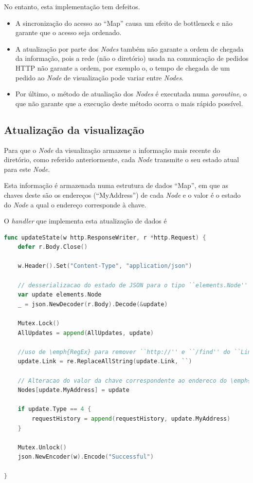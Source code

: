 No entanto, esta implementação tem defeitos. 
\begin{itemize}
	\item 
A sincronização do acesso ao ``Map'' causa um efeito de bottleneck e não garante que o acesso seja ordenado.

	\item 
A atualização por parte dos \emph{Nodes} também não garante a ordem de chegada da informação, pois a rede (não o diretório) usada
na comunicação de pedidos \acs{HTTP} não garante a ordem, por exemplo o, o tempo de chegada de um pedido ao \emph{Node} de visualização
pode variar entre \emph{Nodes}.

	\item 
Por último, o método de atualiação dos \emph{Nodes} é executada numa \emph{goroutine}, o que não garante que a execução deste método 
ocorra o mais rápido possível.

\end{itemize}

\subsection*{Atualização da visualização}
Para que o \emph{Node} da visualização armazene a informação mais recente do diretório, como referido anteriormente,
cada \emph{Node} transmite o seu estado atual para este \emph{Node}.

Esta informação é armazenada numa estrutura de dados ``Map'', em que as chaves deste são os endereços (``MyAddress'') de cada 
\emph{Node} e o valor é o estado do \emph{Node} a qual o endereço corresponde à chave.

O \emph{handler} que implementa esta atualização de dados é 

\begin{lstlisting}[caption={\emph{Handler} ``updateState'' do método ``/updateState''},language=Go]
	func updateState(w http.ResponseWriter, r *http.Request) {
	defer r.Body.Close()

	w.Header().Set("Content-Type", "application/json")

	// desserializacao do estado de JSON para o tipo ``elements.Node''
	var update elements.Node
	_ = json.NewDecoder(r.Body).Decode(&update)

	Mutex.Lock()
	AllUpdates = append(AllUpdates, update)

	//uso de \emph{RegEx} para remover ``http://'' e ``/find'' do ``Link'' da atualizacao
	update.Link = re.ReplaceAllString(update.Link, ``)

	// Alteracao do valor da chave correspondente ao endereco do \emph{Node} que fez atualizacao com o seu novo estado
	Nodes[update.MyAddress] = update

	if update.Type == 4 {
		requestHistory = append(requestHistory, update.MyAddress)
	}

	Mutex.Unlock()
	json.NewEncoder(w).Encode("Successful")

}

\end{lstlisting}


